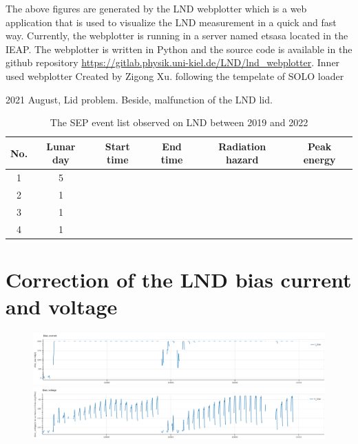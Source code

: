 The above figures are generated by the LND webplotter which is a web application that is used to visualize the LND measurement in a quick and fast way. 
Currently, the webplotter is running in a server named etsasa located in the IEAP.
The webplotter is written in Python and the source code is available in the github repository \url{https://gitlab.physik.uni-kiel.de/LND/lnd_webplotter}. 
Inner used webplotter 
Created by Zigong Xu. following the tempelate of SOLO loader

2021 August, Lid problem. Beside, malfunction of the LND lid.

\begin{table}[!h]
    \centering
    \caption[The SEP event list observed on LND]{The SEP event list observed on LND between 2019 and 2022}
\begin{tabular}{cccccc}
    \hline
    No.     & Lunar day & Start time    & End time      & Radiation hazard  & Peak energy\\
    \hline
    1       & 5         &               &               &  &\\
    2       & 1         &               &               &   &\\
    3       & 1         &               &               &   &\\
    4       & 1         &               &               &   &\\    
    \hline
\end{tabular}
\label{Tab:appendix_LND_SEP_list}
\end{table}

\section{Correction of the LND bias current and voltage}
\clearpage
\begin{figure}
    \centering
    \includegraphics[angle = 90]{images/lnd_bias_current.png}
    \includegraphics{images/lnd_bias_voltage.png}
    \caption{}
    \label{Fig:appendix_LND_bias_current_voltage}
\end{figure}


